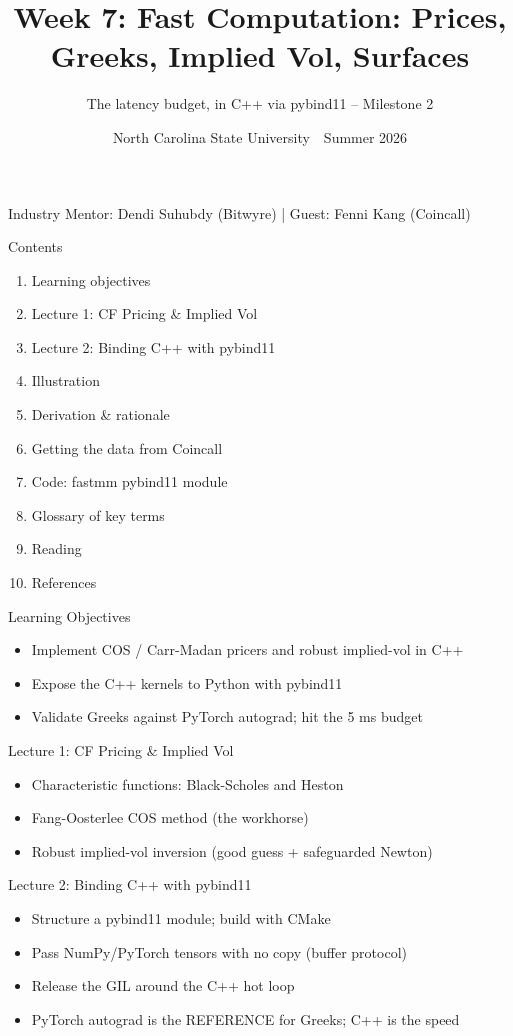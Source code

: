 \documentclass[aspectratio=169,10pt]{beamer}
\title{Week 7: Fast Computation: Prices, Greeks, Implied Vol, Surfaces}
\subtitle{The latency budget, in C++ via pybind11 -- Milestone 2}
\date{North Carolina State University \,\textbar\, Summer 2026}
\begin{document}
\begin{frame}[plain]\titlepage\begin{center}\tiny Industry Mentor: Dendi Suhubdy (Bitwyre)  |  Guest: Fenni Kang (Coincall)\end{center}\end{frame}
\begin{frame}{Contents}
\small\begin{enumerate}\setlength{\itemsep}{3pt}
  \item Learning objectives
  \item Lecture 1: CF Pricing \& Implied Vol
  \item Lecture 2: Binding C++ with pybind11
  \item Illustration
  \item Derivation \& rationale
  \item Getting the data from Coincall
  \item Code: fastmm pybind11 module
  \item Glossary of key terms
  \item Reading
  \item References
\end{enumerate}
\end{frame}

\begin{frame}{Learning Objectives}
\begin{itemize}
  \item Implement COS / Carr-Madan pricers and robust implied-vol in C++
  \item Expose the C++ kernels to Python with pybind11
  \item Validate Greeks against PyTorch autograd; hit the 5 ms budget
\end{itemize}
\end{frame}

\begin{frame}{Lecture 1: CF Pricing \& Implied Vol}
\begin{itemize}
  \item Characteristic functions: Black-Scholes and Heston
  \item Fang-Oosterlee COS method (the workhorse)
  \item Robust implied-vol inversion (good guess + safeguarded Newton)
\end{itemize}
\end{frame}

\begin{frame}{Lecture 2: Binding C++ with pybind11}
\begin{itemize}
  \item Structure a pybind11 module; build with CMake
  \item Pass NumPy/PyTorch tensors with no copy (buffer protocol)
  \item Release the GIL around the C++ hot loop
  \item PyTorch autograd is the REFERENCE for Greeks; C++ is the speed
\end{itemize}
\end{frame}
\end{document}
